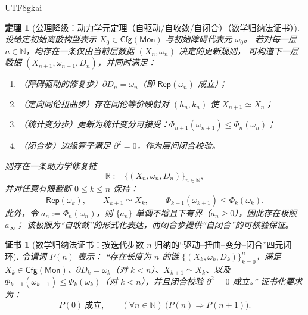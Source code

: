 \documentclass[12pt]{article}
\newtheorem{theorem}{定理}[section]
\newtheorem{Certificate}{证书}[section]
\newcommand{\NN}{\mathbb{N}}
\begin{document}
\begin{CJK*}{UTF8}{gkai}
\begin{theorem}[公理降级：动力学元定理（自驱动/自收敛/自闭合）（数学归纳法证书）]
\label{thm:tex29-dynamics-meta-theorem}
设给定初始离散构型表示 $X_0\in\mathsf{Cfg}(\mathsf{Mon})$ 与初始障碍代表元 $\omega_0$。
若对每一层 $n\in\NN$，均存在一条仅由当前层数据 $(X_n,\omega_n)$ 决定的更新规则，
可构造下一层数据 $(X_{n+1},\omega_{n+1},D_n)$，并同时满足：
\begin{enumerate}
  \item （障碍驱动的修复步）$\partial D_n=\omega_n$（即 $\mathsf{Rep}(\omega_n)$ 成立）；
  \item （定向同伦扭曲步）存在同伦等价映射对 $(h_n,k_n)$ 使 $X_{n+1}\simeq X_n$；
  \item （统计变分步）更新为统计变分可接受：$\Phi_{n+1}(\omega_{n+1})\le \Phi_n(\omega_n)$；
  \item （闭合步）边缘算子满足 $\partial^2=0$，作为层间闭合校验。
\end{enumerate}
则存在一条动力学修复链
\[
  \mathbb{R}:=\bigl\{(X_n,\omega_n,D_n)\bigr\}_{n\in\NN},
\]
并对任意有限截断 $0\le k\le n$ 保持：
\[
  \mathsf{Rep}(\omega_k),\qquad X_{k+1}\simeq X_k,\qquad \Phi_{k+1}(\omega_{k+1})\le \Phi_k(\omega_k).
\]
此外，令 $a_n:=\Phi_n(\omega_n)$，则 $\{a_n\}$ 单调不增且下有界（$a_n\ge 0$），因此存在极限 $a_\infty$；
该极限为“自收敛”的形式化表达，而闭合步提供“自闭合”的可核验保证。
\end{theorem}

\begin{Certificate}[数学归纳法证书：按迭代步数 $n$ 归纳的“驱动--扭曲--变分--闭合”四元闭环]
\label{cert:tex29-dynamics-meta-theorem}
令谓词 $P(n)$ 表示：
“存在长度为 $n$ 的链 $\{(X_k,\omega_k,D_k)\}_{k=0}^{n}$，满足
$X_k\in\mathsf{Cfg}(\mathsf{Mon})$、$\partial D_k=\omega_k$（对 $k<n$）、$X_{k+1}\simeq X_k$、以及
$\Phi_{k+1}(\omega_{k+1})\le \Phi_k(\omega_k)$（对 $k<n$），并且闭合校验 $\partial^2=0$ 成立。”
证书化要求为：
\[
  P(0)\ \text{成立},\qquad (\forall n\in\NN)\ \bigl(P(n)\Rightarrow P(n+1)\bigr).
\]
\end{Certificate}


\end{CJK*}
\end{document}
